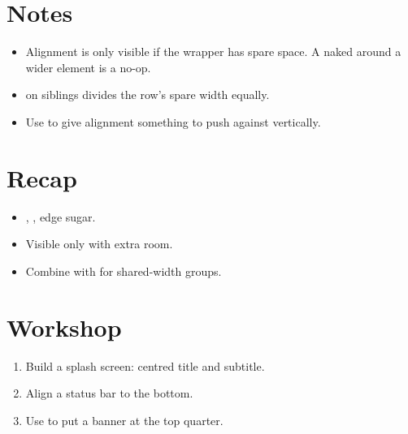\section{Notes}

\begin{itemize}[leftmargin=*]
  \item Alignment is only visible if the wrapper has spare
    space. A naked  around a wider element is a
    no-op.
  \item {} on siblings divides the row's spare
    width equally.
  \item Use  to give alignment something
    to push against vertically.
\end{itemize}

\section{Recap}

\begin{recap}
\begin{itemize}[leftmargin=*]
  \item {}, , edge sugar.
  \item Visible only with extra room.
  \item Combine with  for shared-width groups.
\end{itemize}
\end{recap}

\section*{Workshop}

\begin{enumerate}[leftmargin=*]
  \item Build a splash screen: centred title and subtitle.
  \item Align a status bar to the bottom.
  \item Use  to put a banner at
    the top quarter.
\end{enumerate}
